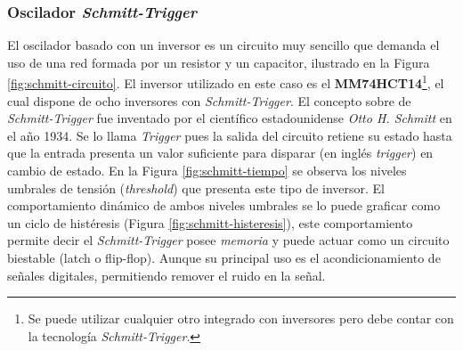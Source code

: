 \documentclass[11pt,a4paper,oneside]{article}
\begin{document}
\subsubsection{Oscilador \textsl{Schmitt-Trigger}}
\label{sec:osc-schmitt}

El oscilador basado con un inversor es un circuito muy sencillo que demanda el uso de una red formada por un resistor y un capacitor, ilustrado en la Figura \ref{fig:schmitt-circuito}. El inversor utilizado en este caso es el \textbf{MM74HCT14}\footnote{Se puede utilizar cualquier otro integrado con inversores pero debe contar con la tecnología \textsl{Schmitt-Trigger}.}, el cual dispone de ocho inversores con \textsl{Schmitt-Trigger}. El concepto sobre de \textsl{Schmitt-Trigger} fue inventado por el científico estadounidense \emph{Otto H. Schmitt} en el año 1934. Se lo llama \emph{Trigger} pues la salida del circuito retiene su estado hasta que la entrada presenta un valor suficiente para disparar (en inglés \textsl{trigger}) en cambio de estado. En la Figura \ref{fig:schmitt-tiempo} se observa los niveles umbrales de tensión (\textsl{threshold}) que presenta este tipo de inversor. El comportamiento dinámico de ambos niveles umbrales se lo puede graficar como un ciclo de histéresis (Figura \ref{fig:schmitt-histeresis}), este comportamiento permite decir el \textsl{Schmitt-Trigger} posee \emph{memoria} y puede actuar como un circuito biestable (latch o flip-flop). Aunque su principal uso es el acondicionamiento de señales digitales, permitiendo remover el ruido en la señal.
\end{document}
